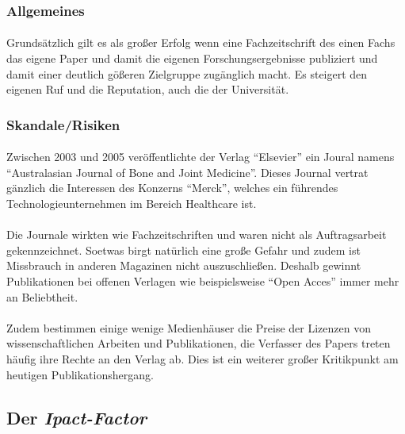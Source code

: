 \documentclass[10pt, a4paper]{article}
\begin{document}
\subsubsection{Allgemeines}
\paragraph{}
Grundsätzlich gilt es als großer Erfolg wenn eine Fachzeitschrift des einen Fachs das eigene Paper und damit die eigenen Forschungsergebnisse publiziert und damit einer deutlich gößeren Zielgruppe zugänglich macht. Es steigert den eigenen Ruf und die Reputation, auch die der Universität.\par

\subsubsection{Skandale/Risiken}
\paragraph{}
Zwischen 2003 und 2005 veröffentlichte der Verlag \enquote{Elsevier} ein Joural namens \enquote{Australasian Journal of Bone and Joint Medicine}. Dieses Journal vertrat gänzlich die Interessen des Konzerns \enquote{Merck}, welches ein führendes Technologieunternehmen im Bereich Healthcare ist.\par
\paragraph{}
Die Journale wirkten wie Fachzeitschriften und waren nicht als Auftragsarbeit gekennzeichnet. Soetwas birgt natürlich eine große Gefahr und zudem ist Missbrauch in anderen Magazinen nicht auszuschließen. Deshalb gewinnt Publikationen bei offenen Verlagen wie beispielsweise \enquote{Open Acces} immer mehr an Beliebtheit.\par
\paragraph{}
Zudem bestimmen einige wenige Medienhäuser die Preise der Lizenzen von wissenschaftlichen Arbeiten und Publikationen, die Verfasser des Papers treten häufig ihre Rechte an den Verlag ab. Dies ist ein weiterer großer Kritikpunkt am heutigen Publikationshergang. \par

\subsection{Der \textit{Ipact-Factor}}
\end{document}
